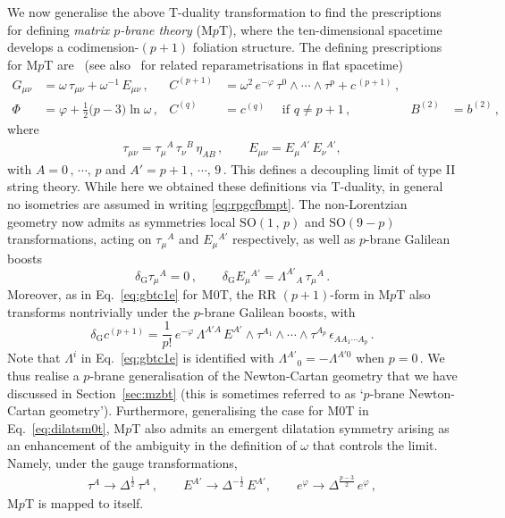 \documentclass[11pt]{article}
\newcommand{\be}{\begin{equation}}
\newcommand{\ee}{\end{equation}}
\renewcommand{\emph}[1]{\textit{#1}}
\begin{document}
We now generalise the above T-duality transformation to find the prescriptions for defining \emph{matrix $p$-brane theory} (M$p$T), where the ten-dimensional spacetime develops a codimension-$(p+1)$ foliation structure. The defining prescriptions for M$p$T are~\cite{Blair:2023noj, Gomis:2023eav, Ebert:2021mfu} (see also~\cite{Gopakumar:2000ep, Gomis:2000bd, Gomis:2004pw} for related reparametrisations in flat spacetime)
%
\begin{subequations} \label{eq:rpgcfbmpt}
\begin{align}
    G_{\mu\nu} & = \omega \, \tau^{}_{\mu\nu} + \omega^{-1} \, E^{}_{\mu\nu}\,, 
        &
    C^{(p+1)} & = \omega^2 \, e^{-\varphi} \, \tau^0 \wedge \cdots \wedge \tau^p + c^{\,(p+1)}\,, \\[4pt]
    \Phi & = \varphi + \tfrac{1}{2} \bigl( p - 3 \bigr) \ln \omega\,, 
        &
    C^{(q)} & = c^{(q)} \quad \text{ if } q \neq p+1\,,
        &
    B^{(2)} &= b^{(2)}\,,
\end{align}
\end{subequations}
%
where 
%
\begin{align}
    \tau^{}_{\mu\nu} = \tau^{}_\mu{}^A \, \tau^{}_\nu{}^B \, \eta^{}_{AB}\,,
        \qquad%
    E^{}_{\mu\nu} = E^{}_\mu{}^{A'} \, E^{}_\nu{}^{A'},
\end{align}
%
with $A = 0\,, \, \cdots, \, p$ and $A' = p+1 \,, \, \cdots, \, 9$\,. 
This defines a decoupling limit of type II string theory.
While here we obtained these definitions via T-duality, in general no isometries are assumed in writing \eqref{eq:rpgcfbmpt}. 
The non-Lorentzian geometry now admits as symmetries local $\mathrm{SO}(1\,,\,p)$ and $\mathrm{SO}(9-p)$ transformations, acting on $\tau_\mu{}^A$ and $E^{}_\mu{}^{A'}$ respectively, as well as $p$-brane Galilean boosts
%
\be
    \delta^{}_\text{G} \tau_\mu{}^A = 0 \,,
        \qquad%
    \delta^{}_\text{G} E_\mu{}^{A'} = \Lambda^{A'}{}_{\!A} \, \tau_\mu{}^A \,.
\ee
%
Moreover, as in Eq.~\eqref{eq:gbtc1e} for M0T, the RR $(p + 1)$-form in M$p$T also transforms nontrivially under the $p$-brane Galilean boosts, with
%
\be
    \delta^{}_\text{G} c^{(p+1)} = \frac{1}{p!} \, e^{-\varphi} \, \Lambda^{A'A} \, E^{A'} \wedge \tau^{A_1} \wedge \cdots \wedge \tau^{A_p} \, \epsilon^{}_{AA_1\cdots A_p}\,. 
\ee
%
Note that $\Lambda^i$ in Eq.~\eqref{eq:gbtc1e} is identified with $\Lambda^{A'}{}_0 = - \Lambda^{A'0}$ when $p=0$\,. We thus realise a $p$-brane generalisation of the Newton-Cartan geometry that we have discussed in Section~\ref{sec:mzbt} (this is sometimes referred to as `$p$-brane Newton-Cartan geometry'). Furthermore, generalising the case for M0T in Eq.~\eqref{eq:dilatsm0t}, M$p$T also admits an emergent dilatation symmetry arising as an enhancement of the ambiguity in the definition of $\omega$ that controls the limit. Namely, under the gauge transformations,
%
\begin{align} \label{eq:dilatsmpt}
    \tau^A \rightarrow \Delta^{\frac{1}{2}} \, \tau^A\,,
        \qquad%
    E^{A'} \rightarrow \Delta^{-\frac{1}{2}} \, E^{A'},
        \qquad%
    e^\varphi \rightarrow \Delta^{\frac{p - 3}{2}} \, e^\varphi\,,
\end{align}
%
M$p$T is mapped to itself. 
\end{document}
